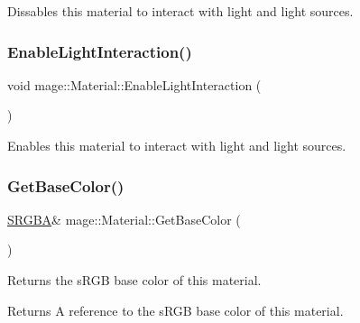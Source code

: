 Dissables this material to interact with light and light sources. \hypertarget{classmage_1_1_material_abbcdcc3a9cb44c854212508c8419aa7f}{}\label{classmage_1_1_material_abbcdcc3a9cb44c854212508c8419aa7f} 
\subsubsection{\texorpdfstring{Enable\+Light\+Interaction()}{EnableLightInteraction()}}
{\footnotesize\ttfamily void mage\+::\+Material\+::\+Enable\+Light\+Interaction (\begin{DoxyParamCaption}{ }\end{DoxyParamCaption})\hspace{0.3cm}{\ttfamily [noexcept]}}

Enables this material to interact with light and light sources. \hypertarget{classmage_1_1_material_a8c6c6e3bb527b98320446206306c6979}{}\label{classmage_1_1_material_a8c6c6e3bb527b98320446206306c6979} 
\subsubsection{\texorpdfstring{Get\+Base\+Color()}{GetBaseColor()}\hspace{0.1cm}{\footnotesize\ttfamily [1/2]}}
{\footnotesize\ttfamily \hyperlink{structmage_1_1_s_r_g_b_a}{S\+R\+G\+BA}\& mage\+::\+Material\+::\+Get\+Base\+Color (\begin{DoxyParamCaption}{ }\end{DoxyParamCaption})\hspace{0.3cm}{\ttfamily [noexcept]}}

Returns the s\+R\+GB base color of this material.

\begin{DoxyReturn}{Returns}
A reference to the s\+R\+GB base color of this material. 
\end{DoxyReturn}
\hypertarget{classmage_1_1_material_abadf5557a1047cb7c371c715e99876a3}{}\label{classmage_1_1_material_abadf5557a1047cb7c371c715e99876a3} 

